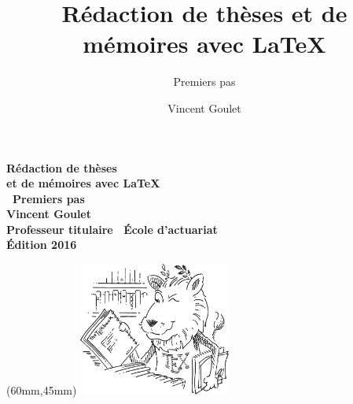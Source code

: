 \documentclass[aspectratio=54,10pt,xcolor=x11names]{beamer}
\title[]{Rédaction de thèses et de mémoires avec {\LaTeX}}
\subtitle{Premiers pas}
\author[]{Vincent Goulet}
\institute{Professeur titulaire, École d'actuariat, Université Laval}
\date{\year}
\renewcommand{\year}{2016}            %
\theoremstyle{example}
\begin{document}
{
  \frame[plain]{}
}

\begin{frame}[plain]
  \titles
  \bfseries\fontsize{16}{16}\selectfont Rédaction de thèses \\
                                        et de mémoires avec {\LaTeX} \\[5mm]
  \bfseries\fontsize{12}{12} \textbar\ Premiers pas \\
  \vspace*{15mm}
  \bfseries\fontsize{10}{12}\selectfont Vincent Goulet \\
  \mdseries\fontsize{8}{10}\selectfont  Professeur titulaire \textbar\
                                        École d'actuariat \\
  \vspace*{25mm}
  \mdseries\fontsize{8}{10}\selectfont Édition \year
  \begin{textblock*}{50mm}(60mm,45mm)
    \includegraphics[width=50mm]{ctanlion}
  \end{textblock*}
\end{frame}
\end{document}
